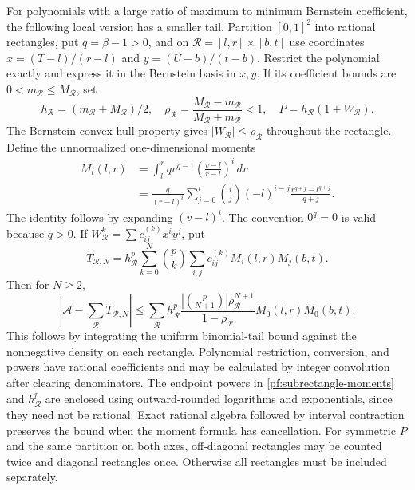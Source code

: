 For polynomials with a large ratio of maximum to minimum Bernstein
coefficient, the following local version has a smaller tail. Partition
$[0,1]^2$ into rational rectangles, put $q=\beta-1>0$, and on
$\mathcal R=[l,r]\times[b,t]$ use coordinates
$x=(T-l)/(r-l)$ and $y=(U-b)/(t-b)$. Restrict the polynomial exactly and
express it in the Bernstein basis in $x,y$. If its coefficient bounds are
$0<m_{\mathcal R}\le M_{\mathcal R}$, set
\[
 h_{\mathcal R}=(m_{\mathcal R}+M_{\mathcal R})/2,\quad
 \rho_{\mathcal R}=
 \frac{M_{\mathcal R}-m_{\mathcal R}}{M_{\mathcal R}+m_{\mathcal R}}<1,
 \quad P=h_{\mathcal R}(1+W_{\mathcal R}).
\]
The Bernstein convex-hull property gives
$|W_{\mathcal R}|\le\rho_{\mathcal R}$ throughout the rectangle.
Define the unnormalized one-dimensional moments
\begin{equation}\label{pf:subrectangle-moments}
 \begin{split}
 M_i(l,r)&=\int_l^r qv^{q-1}
       \left(\frac{v-l}{r-l}\right)^i\,dv\\
 &=\frac q{(r-l)^i}\sum_{j=0}^i\binom ij(-l)^{i-j}
             \frac{r^{q+j}-l^{q+j}}{q+j}.
 \end{split}
\end{equation}
The identity follows by expanding $(v-l)^i$. The convention $0^q=0$
is valid because $q>0$. If
$W_{\mathcal R}^k=\sum c^{(k)}_{ij}x^iy^j$, put
\[
 T_{\mathcal R,N}=h_{\mathcal R}^{p}
 \sum_{k=0}^N\binom pk\sum_{i,j}c^{(k)}_{ij}M_i(l,r)M_j(b,t).
\]
Then for $N\ge2$,
\begin{equation}\label{pf:subrectangle-mass}
 \left|\mathcal A-\sum_{\mathcal R}T_{\mathcal R,N}\right|
 \le\sum_{\mathcal R}h_{\mathcal R}^{p}
 \frac{|\binom p{N+1}|\rho_{\mathcal R}^{N+1}}
      {1-\rho_{\mathcal R}}M_0(l,r)M_0(b,t).
\end{equation}
This follows by integrating the uniform binomial-tail bound against the
nonnegative density on each rectangle. Polynomial restriction,
conversion, and powers have rational coefficients and may be calculated
by integer convolution after clearing denominators. The endpoint powers
in \eqref{pf:subrectangle-moments} and $h_{\mathcal R}^p$ are enclosed
using outward-rounded logarithms and exponentials, since they need not
be rational. Exact rational algebra followed by interval contraction
preserves the bound when the moment formula has cancellation. For symmetric $P$
and the same partition on both axes, off-diagonal rectangles may be
counted twice and diagonal rectangles once. Otherwise all rectangles
must be included separately.

